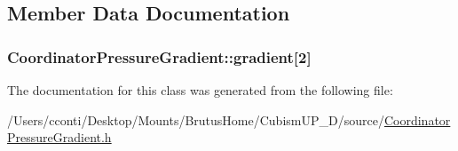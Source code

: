 \subsection{Member Data Documentation}
\hypertarget{class_coordinator_pressure_gradient_a1493ac9c9d9fdf6d2b3e3b9eeaedc076}{}
\subsubsection[{gradient}]{ Coordinator\+Pressure\+Gradient\+::gradient\mbox{[}2\mbox{]}\hspace{0.3cm}{\ttfamily [protected]}}\label{class_coordinator_pressure_gradient_a1493ac9c9d9fdf6d2b3e3b9eeaedc076}


The documentation for this class was generated from the following file\+:\begin{DoxyCompactItemize}
\item 
/\+Users/cconti/\+Desktop/\+Mounts/\+Brutus\+Home/\+Cubism\+U\+P\+\_\+D/source/\hyperlink{_coordinator_pressure_gradient_8h}{Coordinator\+Pressure\+Gradient.\+h}\end{DoxyCompactItemize}
